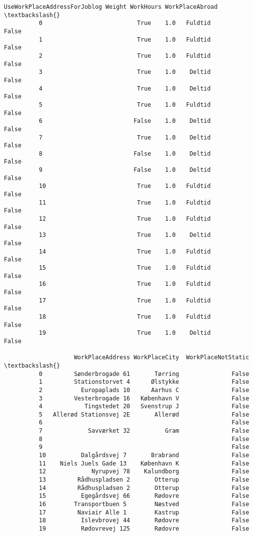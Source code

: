 \documentclass[11pt]{article}
\begin{document}
\begin{Verbatim}[commandchars=\\\{\}]
              UseWorkPlaceAddressForJoblog Weight WorkHours WorkPlaceAbroad  \textbackslash{}
          0                           True    1.0   Fuldtid           False   
          1                           True    1.0   Fuldtid           False   
          2                           True    1.0   Fuldtid           False   
          3                           True    1.0    Deltid           False   
          4                           True    1.0    Deltid           False   
          5                           True    1.0   Fuldtid           False   
          6                          False    1.0    Deltid           False   
          7                           True    1.0    Deltid           False   
          8                          False    1.0    Deltid           False   
          9                          False    1.0    Deltid           False   
          10                          True    1.0   Fuldtid           False   
          11                          True    1.0   Fuldtid           False   
          12                          True    1.0   Fuldtid           False   
          13                          True    1.0    Deltid           False   
          14                          True    1.0   Fuldtid           False   
          15                          True    1.0   Fuldtid           False   
          16                          True    1.0   Fuldtid           False   
          17                          True    1.0   Fuldtid           False   
          18                          True    1.0   Fuldtid           False   
          19                          True    1.0    Deltid           False   
          
                    WorkPlaceAddress WorkPlaceCity  WorkPlaceNotStatic  \textbackslash{}
          0         Sønderbrogade 61       Tørring               False   
          1         Stationstorvet 4      Ølstykke               False   
          2           Europaplads 10      Aarhus C               False   
          3         Vesterbrogade 16   København V               False   
          4            Tingstedet 20   Svenstrup J               False   
          5   Allerød Stationsvej 2E       Allerød               False   
          6                                                      False   
          7             Savværket 32          Gram               False   
          8                                                      False   
          9                                                      False   
          10          Dalgårdsvej 7       Brabrand               False   
          11    Niels Juels Gade 13    København K               False   
          12             Nyrupvej 78    Kalundborg               False   
          13         Rådhuspladsen 2       Otterup               False   
          14         Rådhuspladsen 2       Otterup               False   
          15          Egegårdsvej 66       Rødovre               False   
          16        Transportbuen 5        Næstved               False   
          17         Naviair Alle 1        Kastrup               False   
          18          Islevbrovej 44       Rødovre               False   
          19          Rødovrevej 125       Rødovre               False   
          

\end{Verbatim}
\end{document}
